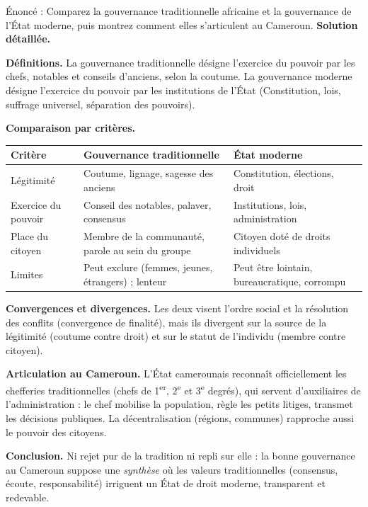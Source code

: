 \documentclass[11pt]{article}
\newcommand{\cle}[1]{{\popxbold\color{popdark}#1}}
\begin{document}
\begin{exoresolu}
Énoncé : Comparez la gouvernance traditionnelle africaine et la gouvernance de l'État moderne, puis montrez comment elles s'articulent au Cameroun.
\tcblower
\textbf{Solution détaillée.}

\textbf{Définitions.} La \cle{gouvernance traditionnelle} désigne l'exercice du pouvoir par les chefs, notables et conseils d'anciens, selon la coutume. La \cle{gouvernance moderne} désigne l'exercice du pouvoir par les institutions de l'État (Constitution, lois, suffrage universel, séparation des pouvoirs).

\textbf{Comparaison par critères.}
\begin{center}
\begin{tabularx}{\linewidth}{|l|X|X|}\hline
\rowcolor{popblueL} \textbf{Critère} & \textbf{Gouvernance traditionnelle} & \textbf{État moderne} \\ \hline
Légitimité & Coutume, lignage, sagesse des anciens & Constitution, élections, droit \\ \hline
Exercice du pouvoir & Conseil des notables, palaver, consensus & Institutions, lois, administration \\ \hline
Place du citoyen & Membre de la communauté, parole au sein du groupe & Citoyen doté de droits individuels \\ \hline
Limites & Peut exclure (femmes, jeunes, étrangers) ; lenteur & Peut être lointain, bureaucratique, corrompu \\ \hline
\end{tabularx}
\end{center}

\textbf{Convergences et divergences.} Les deux visent l'ordre social et la résolution des conflits (convergence de finalité), mais ils divergent sur la source de la légitimité (coutume contre droit) et sur le statut de l'individu (membre contre citoyen).

\textbf{Articulation au Cameroun.} L'État camerounais reconnaît officiellement les chefferies traditionnelles (chefs de 1\textsuperscript{er}, 2\textsuperscript{e} et 3\textsuperscript{e} degrés), qui servent d'auxiliaires de l'administration : le chef mobilise la population, règle les petits litiges, transmet les décisions publiques. La décentralisation (régions, communes) rapproche aussi le pouvoir des citoyens.

\textbf{Conclusion.} Ni rejet pur de la tradition ni repli sur elle : la bonne gouvernance au Cameroun suppose une \emph{synthèse} où les valeurs traditionnelles (consensus, écoute, responsabilité) irriguent un État de droit moderne, transparent et redevable.
\end{exoresolu}
\end{document}
